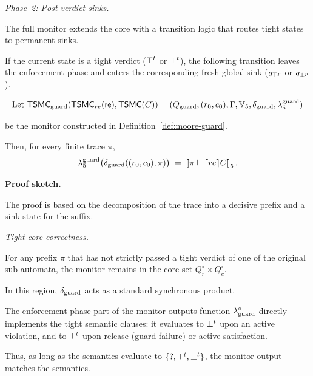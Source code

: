       

      \smallskip

      \noindent\emph{Phase~2: Post-verdict sinks.}

      The full monitor extends the core with a transition logic that routes tight states to permanent sinks.

      If the current state is a tight verdict ($\topt$ or $\bott$), the following transition leaves the enforcement phase and enters the corresponding fresh global sink ($q_{\topp}$ or $q_{\botp}$).

      

      \begin{lemma}
      \label{lem:guard-correct}
      \[\text{Let }
      \tsmc_{\guardd}(\tsmc_{re}(\re),\tsmc(C))
        =(Q_{\guardd},(r_0,c_0),\Gamma,\tightverdicts,\delta_{\guardd},\lambda_5^{\guardd})
      \]

      be the monitor constructed in Definition~\ref{def:moore-guard}.

      Then, for every finite trace $\pi$,
      \[
      \lambda_5^{\guardd}\bigl(\delta_{\guardd}((r_0,c_0),\pi)\bigr)
        \;=\;
      \semfive{\pi \vDash \guard[re]{C}}.
      \]

      \end{lemma}

      \noindent\textbf{Proof sketch.}

      The proof is based  on the decomposition of the trace into a decisive prefix and a sink state for the suffix.

      

      \smallskip

      \emph{Tight-core correctness.}

      For any prefix $\pi$ that has not strictly passed a tight verdict of one of the original sub-automata, the monitor remains in the core set $Q_r^{\circ} \times Q_c^{\circ}$.

      In this region, $\delta_{\guardd}$ acts as a standard synchronous product.

      The enforcement phase part of the monitor outputs function $\lambda_{\guardd}^{\circ}$ directly implements the tight semantic clauses: it evaluates to $\bott$ upon an active violation, and to $\topt$ upon release (guard failure) or active satisfaction.

      Thus, as long as the semantics evaluate to $\{\mathsf{?}, \topt, \bott\}$, the monitor output matches the semantics.

